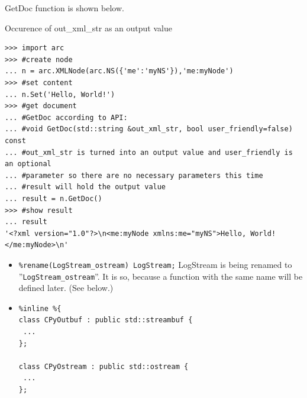 \documentclass{article}
\begin{document}
\begin{flushleft}
\begin{itemize}
{  GetDoc function is shown below.
    \begin{example}
      \caption{Occurence of out\_xml\_str as an output value}\label{outxml}
\begin{verbatim}
>>> import arc
>>> #create node
... n = arc.XMLNode(arc.NS({'me':'myNS'}),'me:myNode')
>>> #set content
... n.Set('Hello, World!')
>>> #get document
... #GetDoc according to API:
... #void GetDoc(std::string &out_xml_str, bool user_friendly=false) const
... #out_xml_str is turned into an output value and user_friendly is an optional 
... #parameter so there are no necessary parameters this time
... #result will hold the output value
... result = n.GetDoc()
>>> #show result
... result
'<?xml version="1.0"?>\n<me:myNode xmlns:me="myNS">Hello, World!</me:myNode>\n'
\end{verbatim}
    \end{example}
  }
\end{itemize}
\begin{itemize}
  \item{\verb$%rename(LogStream_ostream) LogStream;$ \linebreak
  LogStream is being renamed to ''\verb$LogStream_ostream$''.
  It is so, because a function with the same name will be defined later.
  (See below.)
  }
\end{itemize}
\begin{itemize}
  \item{
\begin{verbatim}
%inline %{ 
class CPyOutbuf : public std::streambuf {
 ...
};

class CPyOstream : public std::ostream {
 ...
}; 


\end{verbatim}}
\end{itemize}
\end{flushleft}
\end{document}
